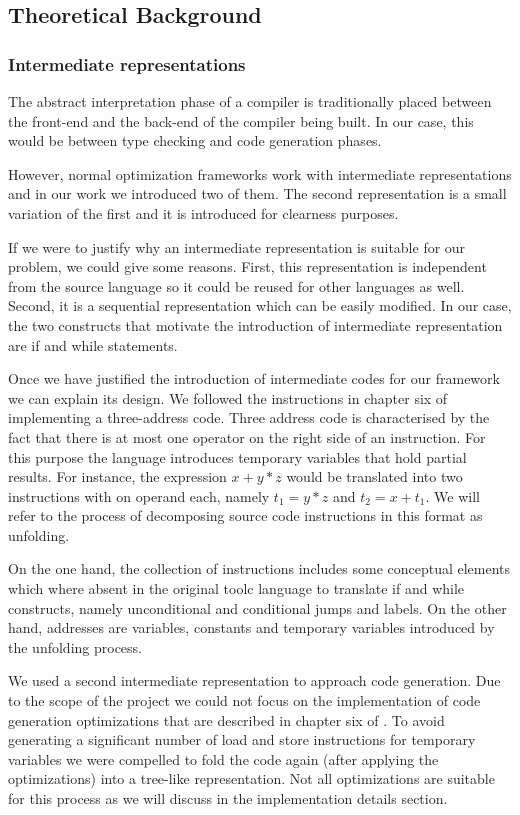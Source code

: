 \subsection{Theoretical Background}

\subsubsection{Intermediate representations}

The abstract interpretation phase of a compiler is traditionally placed between the front-end and the back-end of the compiler being built. In our case, this would be between type checking and code generation phases.

However, normal optimization frameworks work with intermediate representations and in our work we introduced two of them. The second representation is a small variation of the first and it is introduced for clearness purposes. 

If we were to justify why an intermediate representation is suitable for our problem, we could give some reasons. First, this representation is independent from the source language so it could be reused for other languages as well. Second, it is a sequential representation which can be easily modified. In our case, the two constructs that motivate the introduction of intermediate representation are if and while statements. 

Once we have justified the introduction of intermediate codes for our framework we can explain its design. We followed the instructions in chapter six of \cite{DragonBook} implementing a three-address code. Three address code is characterised by the fact that there is at most one operator on the right side of an instruction. For this purpose the language introduces temporary variables that hold partial results. For instance, the expression $x + y*z$ would be translated into two instructions with on operand each, namely $t_1 = y * z$ and $t_2 = x + t_1$. We will refer to the process of decomposing source code instructions in this format as unfolding. 

On the one hand, the collection of instructions includes some conceptual elements which where absent in the original toolc language to translate if and while constructs, namely unconditional and conditional jumps and labels. On the other hand, addresses are variables, constants and temporary variables introduced by the unfolding process. 

We used a second intermediate representation to approach code generation. Due to the scope of the project we could not focus on the implementation of code generation optimizations that are described in chapter six of \cite{DragonBook}. To avoid generating a significant number of load and store instructions for temporary variables we were compelled to fold the code again (after applying the optimizations) into a tree-like representation. Not all optimizations are suitable for this process as we will discuss in the implementation details section. 

